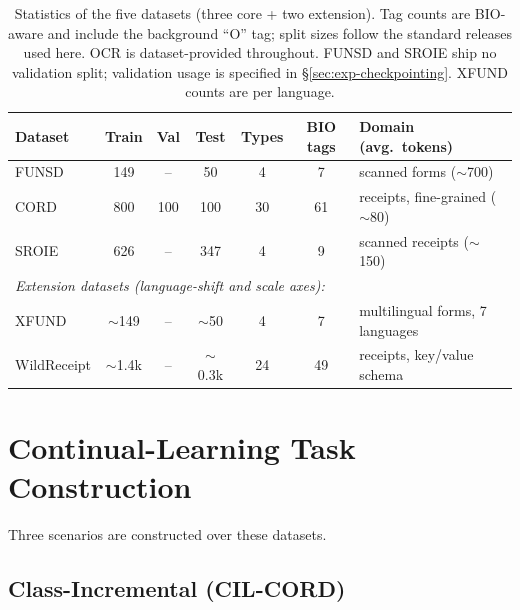 \begin{table}[!htbp]
  \centering
  \caption[Dataset statistics]{Statistics of the five datasets (three core +
  two extension). Tag counts are BIO-aware and include the background ``O'' tag;
  split sizes follow the standard releases used here. OCR is dataset-provided
  throughout. FUNSD and SROIE ship no validation split; validation usage is
  specified in \S\ref{sec:exp-checkpointing}. XFUND counts are per language.}
  \label{tab:dataset-stats}
  \small
  \setlength{\tabcolsep}{5pt}
  \begin{tabular}{lcccccl}
    \toprule
    \textbf{Dataset} & \textbf{Train} & \textbf{Val} & \textbf{Test} & \textbf{Types} & \textbf{BIO tags} & \textbf{Domain (avg.\ tokens)} \\
    \midrule
    FUNSD & 149 & --  & 50  & 4  & 7  & scanned forms ($\sim$700) \\
    CORD  & 800 & 100 & 100 & 30 & 61 & receipts, fine-grained ($\sim$80) \\
    SROIE & 626 & --  & 347 & 4  & 9  & scanned receipts ($\sim$150) \\
    \midrule
    \multicolumn{7}{l}{\itshape Extension datasets (language-shift and scale axes):} \\
    XFUND & $\sim$149 & -- & $\sim$50 & 4 & 7 & multilingual forms, 7 languages \\
    WildReceipt & $\sim$1.4k & -- & $\sim$0.3k & 24 & 49 & receipts, key/value schema \\
    \bottomrule
  \end{tabular}
\end{table}

\section{Continual-Learning Task Construction}
\label{sec:exp-tasks}

Three scenarios are constructed over these datasets.

\subsection{Class-Incremental (CIL-CORD)}
\label{sec:exp-cil}

